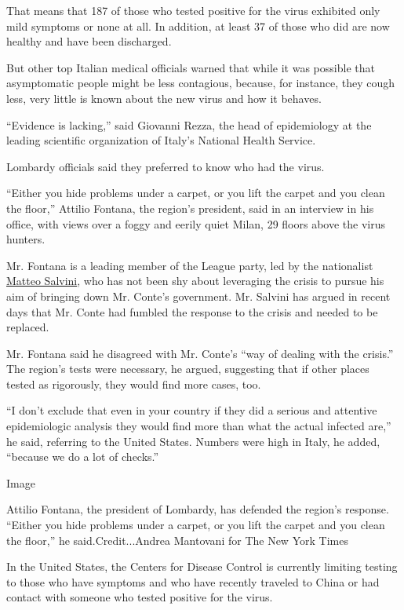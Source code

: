 That means that 187 of those who tested positive for the virus exhibited
only mild symptoms or none at all. In addition, at least 37 of those who
did are now healthy and have been discharged.

But other top Italian medical officials warned that while it was
possible that asymptomatic people might be less contagious, because, for
instance, they cough less, very little is known about the new virus and
how it behaves.

``Evidence is lacking,'' said Giovanni Rezza, the head of epidemiology
at the leading scientific organization of Italy's National Health
Service.

Lombardy officials said they preferred to know who had the virus.

``Either you hide problems under a carpet, or you lift the carpet and
you clean the floor,'' Attilio Fontana, the region's president, said in
an interview in his office, with views over a foggy and eerily quiet
Milan, 29 floors above the virus hunters.

Mr. Fontana is a leading member of the League party, led by the
nationalist
\href{https://www.nytimes3xbfgragh.onion/2020/01/26/world/europe/italy-election-Salvini.html}{Matteo
Salvini}, who has not been shy about leveraging the crisis to pursue his
aim of bringing down Mr. Conte's government. Mr. Salvini has argued in
recent days that Mr. Conte had fumbled the response to the crisis and
needed to be replaced.

Mr. Fontana said he disagreed with Mr. Conte's ``way of dealing with the
crisis.'' The region's tests were necessary, he argued, suggesting that
if other places tested as rigorously, they would find more cases, too.

``I don't exclude that even in your country if they did a serious and
attentive epidemiologic analysis they would find more than what the
actual infected are,'' he said, referring to the United States. Numbers
were high in Italy, he added, ``because we do a lot of checks.''

Image

Attilio Fontana, the president of Lombardy, has defended the region's
response. ``Either you hide problems under a carpet, or you lift the
carpet and you clean the floor,'' he said.Credit...Andrea Mantovani for
The New York Times

In the United States, the Centers for Disease Control is currently
limiting testing to those who have symptoms and who have recently
traveled to China or had contact with someone who tested positive for
the virus.

